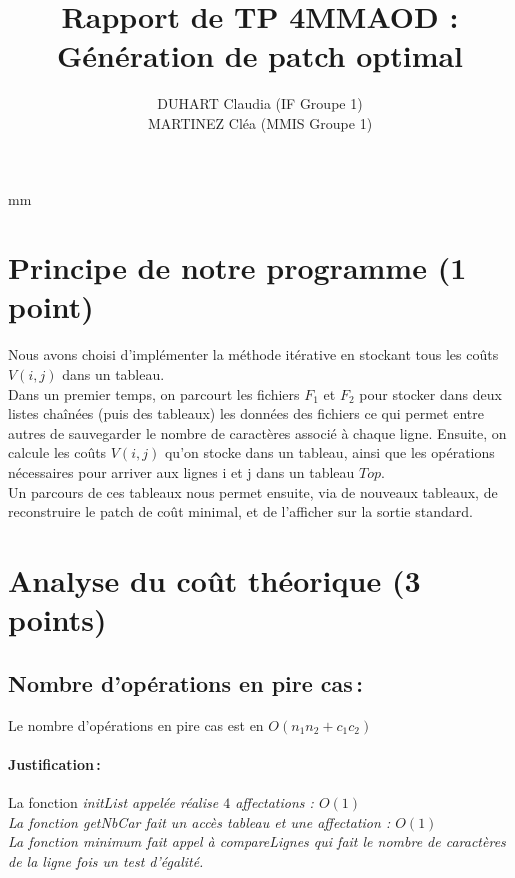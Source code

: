 \documentclass[a4paper, 10pt, french]{article}
\title{Rapport de TP 4MMAOD : Génération de patch optimal}
\author{
DUHART Claudia (IF Groupe 1) 
\\ MARTINEZ Cléa (MMIS Groupe 1) 
}
\begin{document}
\maketitle
{} mm 

\section{Principe de notre  programme (1 point)}

Nous avons choisi d'implémenter la méthode itérative en stockant tous les coûts $V(i,j)$ dans un tableau. \\
Dans un premier temps, on parcourt les fichiers $F_1$ et $F_2$ pour stocker dans deux listes chaînées (puis des tableaux)  les données des fichiers ce qui permet entre autres de sauvegarder le nombre de caractères associé à chaque ligne. 
Ensuite, on calcule les coûts $V(i,j)$ qu'on stocke dans un tableau, ainsi que les opérations nécessaires pour arriver aux lignes i et j dans un tableau $Top$. \\
Un parcours de ces tableaux nous permet ensuite, via de nouveaux tableaux, de reconstruire le patch de coût minimal, et de l'afficher sur la sortie standard. \\
\section{Analyse du coût théorique (3 points)}


  \subsection{Nombre  d'opérations en pire cas\,: }
  
  Le nombre d'opérations en pire cas est en $O(n_1 n_2 + c_1c_2)$
    \paragraph{Justification\,: \\ }
    

        La fonction \it initList \rm appelée  réalise $4$ affectations : $O(1)$ \\
        La fonction \it getNbCar \rm fait un accès tableau et une affectation : $O(1)$ \\
        La fonction \it minimum \rm fait appel à \it compareLignes \rm qui fait le nombre de caractères de la ligne fois un test d'égalité. 
        
\end{document}
